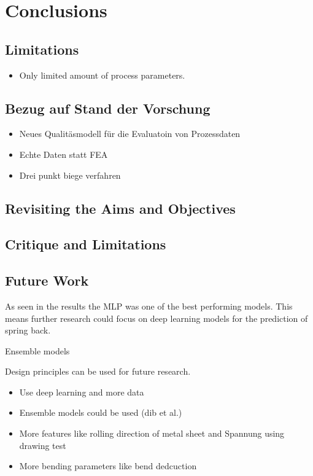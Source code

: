 \chapter{Conclusions}


\section{Limitations}

\begin{itemize}
    \item Only limited amount of process parameters.
\end{itemize}


\section{Bezug auf Stand der Vorschung}

\begin{itemize}
    \item Neues Qualitäsmodell für die Evaluatoin von Prozessdaten
    \item Echte Daten statt FEA
    \item Drei punkt biege verfahren
\end{itemize}


\section{Revisiting the Aims and Objectives}


\section{Critique and Limitations}


\section{Future Work}\label{sec:future-work}

As seen in the results the \ac{MLP} was one of the best performing models.
This means further research could focus on deep learning models for the prediction of
spring back.

Ensemble models

Design principles can be used for future research.


\begin{itemize}
    \item Use deep learning and more data
    \item Ensemble models could be used (dib et al.)
    \item More features like rolling direction of metal sheet and Spannung using
    drawing test
    \item More bending parameters like bend dedcuction
\end{itemize}


